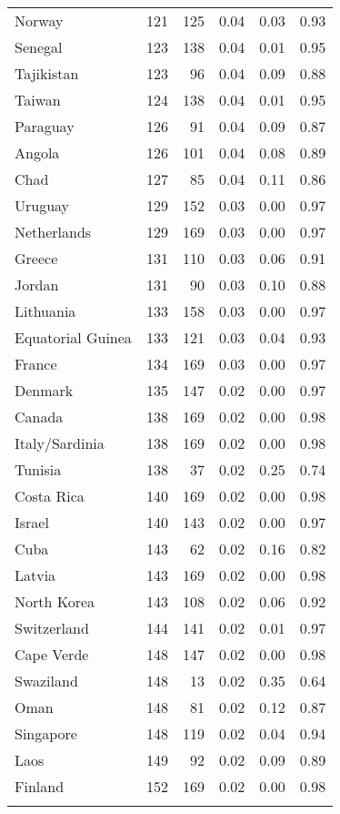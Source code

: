 \begin{longtable}[t]{lrrrrr}
\addlinespace
Norway & 121 & 125 & 0.04 & 0.03 & 0.93\\
Senegal & 123 & 138 & 0.04 & 0.01 & 0.95\\
Tajikistan & 123 & 96 & 0.04 & 0.09 & 0.88\\
Taiwan & 124 & 138 & 0.04 & 0.01 & 0.95\\
Paraguay & 126 & 91 & 0.04 & 0.09 & 0.87\\
\addlinespace
Angola & 126 & 101 & 0.04 & 0.08 & 0.89\\
Chad & 127 & 85 & 0.04 & 0.11 & 0.86\\
Uruguay & 129 & 152 & 0.03 & 0.00 & 0.97\\
Netherlands & 129 & 169 & 0.03 & 0.00 & 0.97\\
Greece & 131 & 110 & 0.03 & 0.06 & 0.91\\
\addlinespace
Jordan & 131 & 90 & 0.03 & 0.10 & 0.88\\
Lithuania & 133 & 158 & 0.03 & 0.00 & 0.97\\
Equatorial Guinea & 133 & 121 & 0.03 & 0.04 & 0.93\\
France & 134 & 169 & 0.03 & 0.00 & 0.97\\
Denmark & 135 & 147 & 0.02 & 0.00 & 0.97\\
\addlinespace
Canada & 138 & 169 & 0.02 & 0.00 & 0.98\\
Italy/Sardinia & 138 & 169 & 0.02 & 0.00 & 0.98\\
Tunisia & 138 & 37 & 0.02 & 0.25 & 0.74\\
Costa Rica & 140 & 169 & 0.02 & 0.00 & 0.98\\
Israel & 140 & 143 & 0.02 & 0.00 & 0.97\\
\addlinespace
Cuba & 143 & 62 & 0.02 & 0.16 & 0.82\\
Latvia & 143 & 169 & 0.02 & 0.00 & 0.98\\
North Korea & 143 & 108 & 0.02 & 0.06 & 0.92\\
Switzerland & 144 & 141 & 0.02 & 0.01 & 0.97\\
Cape Verde & 148 & 147 & 0.02 & 0.00 & 0.98\\
\addlinespace
Swaziland & 148 & 13 & 0.02 & 0.35 & 0.64\\
Oman & 148 & 81 & 0.02 & 0.12 & 0.87\\
Singapore & 148 & 119 & 0.02 & 0.04 & 0.94\\
Laos & 149 & 92 & 0.02 & 0.09 & 0.89\\
Finland & 152 & 169 & 0.02 & 0.00 & 0.98\\
\addlinespace

\end{longtable}

